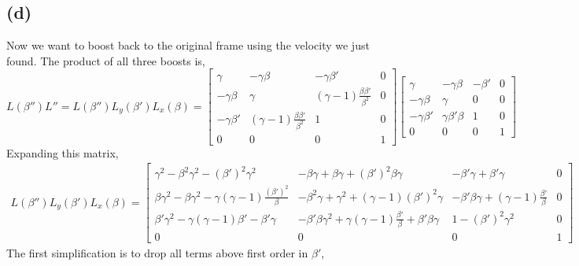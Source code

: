 \documentclass[11pt]{amsart}
\begin{document}
\subsection*{(d)} Now we want to boost back to the original frame using the velocity we just found. The product of all three boosts is,
\[ L(\beta'') L'' =  L(\beta'') L_y(\beta')L_x(\beta) = \begin{bmatrix}
\gamma & - \gamma \beta & - \gamma \beta' & 0 \\
- \gamma \beta & \gamma & (\gamma - 1)\frac{\beta \beta'}{\beta^2} & 0 \\
- \gamma \beta' &  (\gamma - 1)\frac{\beta \beta'}{\beta^2}  & 1 & 0  \\
0  & 0  & 0  & 1
\end{bmatrix}
\begin{bmatrix}
\gamma & -\gamma \beta & - \beta' & 0 \\
- \gamma \beta & \gamma & 0 & 0 \\
- \gamma \beta' & \gamma \beta' \beta & 1 & 0 \\
0 & 0 & 0 & 1 
\end{bmatrix} \]
Expanding this matrix,
\begin{align*}
L(\beta'') L_y(\beta')L_x(\beta) = \begin{bmatrix}
\gamma^2 - \beta^2 \gamma^2 - (\beta')^2 \gamma^2 & - \beta \gamma + \beta 
\gamma + (\beta')^2 \beta \gamma & - \beta' \gamma + \beta' \gamma & 0 \\
\beta \gamma^2 - \beta \gamma^2 - \gamma (\gamma - 1) \frac{(\beta')^2}{\beta} & - \beta^2 \gamma + \gamma^2 + (\gamma - 1) (\beta')^2 \gamma & - \beta' \beta \gamma + (\gamma - 1) \frac{\beta'}{\beta} & 0 \\
\beta' \gamma^2 - \gamma (\gamma - 1) \beta' - \beta' \gamma & - \beta' \beta \gamma^2 + \gamma (\gamma - 1) \frac{\beta'}{\beta} + \beta' \beta \gamma & 1 - (\beta')^2 \gamma^2 & 0 \\
0 & 0 & 0 & 1
\end{bmatrix}
\end{align*}
The first simplification is to drop all terms above first order in $\beta'$,
\end{document}
